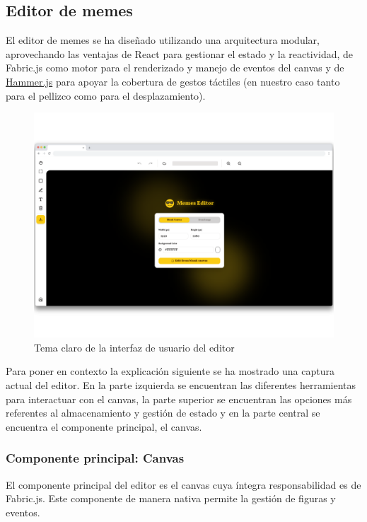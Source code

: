 \subsection{Editor de memes}

El editor de memes se ha diseñado utilizando una arquitectura modular, aprovechando las ventajas de React para gestionar el estado y la reactividad, de Fabric.js como motor para el renderizado y manejo de eventos del canvas y de \href{https://hammerjs.github.io/}{Hammer.js} para apoyar la cobertura de gestos táctiles (en nuestro caso tanto para el pellizco como para el desplazamiento).

\begin{figure}[H]
    \caption{Tema claro de la interfaz de usuario del editor}
    \centering
    \includegraphics[scale=0.11]{figuras/editor_tema_claro.png}
\end{figure}

Para poner en contexto la explicación siguiente se ha mostrado una captura actual del editor. En la parte izquierda se encuentran las diferentes herramientas para interactuar con el canvas, la parte superior se encuentran las opciones más referentes al almacenamiento y gestión de estado y en la parte central se encuentra el componente principal, el canvas.

\subsubsection{Componente principal: Canvas}

El componente principal del editor es el canvas cuya íntegra responsabilidad es de Fabric.js. Este componente de manera nativa permite la gestión de figuras y eventos.

